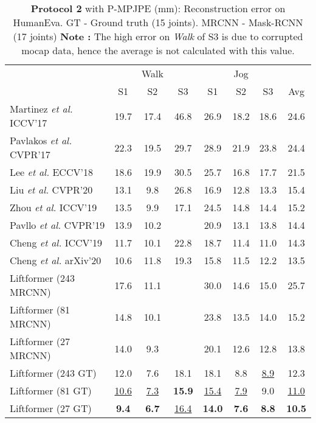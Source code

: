\documentclass[letterpaper]{article}
\begin{document}
\begin{table}[tp]
\begin{adjustbox}{width=1\columnwidth}
\begin{tabular}{l|ccc|ccc|c}
\hline
&  & Walk &  &  & Jog &  & \\
& S1 & S2 & S3 & S1 & S2 & S3 & Avg\\
\hline
Martinez \textit{et al.} ICCV’17 \cite{martinez17} & 19.7 & 17.4 & 46.8 & 26.9 & 18.2 & 18.6 & 24.6\\
Pavlakos \textit{et al.} CVPR’17 \cite{pavlakos18} & 22.3 & 19.5 & 29.7 & 28.9 & 21.9 & 23.8 & 24.4\\
Lee \textit{et al.} ECCV’18 \cite{lee18} & 18.6 & 19.9 & 30.5 & 25.7 & 16.8 & 17.7 & 21.5\\
Liu \textit{et al.} CVPR’20 \cite{liu20} & 13.1 & 9.8 & 26.8 & 16.9 & 12.8 & 13.3 & 15.4\\
Zhou \textit{et al.} ICCV'19 \cite{zhou19} & 13.5 & 9.9 & 17.1 & 24.5 & 14.8 & 14.4 & 15.2 \\
Pavllo \textit{et al.} CVPR’19 \cite{pavllo19} & 13.9 & 10.2 &  & 20.9 & 13.1 & 13.8 & 14.4 \\
Cheng \textit{et al.} ICCV'19 \cite{cheng19} & 11.7 & 10.1 & 22.8 & 18.7 & 11.4 & 11.0 & 14.3\\
Cheng \textit{et al.} arXiv'20 \cite{cheng20} & 10.6 & 11.8 & 19.3 & 15.8 & 11.5 & 12.2 & 13.5\\
\hline
Liftformer (243 MRCNN) & 17.6 & 11.1 &  & 30.0 & 14.6 & 15.0 & 25.7 \\
Liftformer (81 MRCNN) & 14.8 & 10.1 &  & 23.8 & 13.5 & 14.0 & 15.2 \\
Liftformer (27 MRCNN) & 14.0 & 9.3 &  & 20.1 & 12.6 & 12.8 & 13.8 \\
\hline
Liftformer (243 GT)  & 12.0 & 7.6 & 18.1 & 18.1 & 8.8 & \underline{8.9} & 12.3\\
Liftformer (81 GT)  & \underline{10.6} & \underline{7.3} & \textbf{15.9} & \underline{15.4} & \underline{7.9} & 9.0 & \underline{11.0}\\
Liftformer (27 GT) & \textbf{9.4} & \textbf{6.7} & \underline{16.4} & \textbf{14.0} & \textbf{7.6} & \textbf{8.8} & \textbf{10.5}\\
\end{tabular}
\end{adjustbox}
\caption{\textbf{Protocol 2} with P-MPJPE (mm): Reconstruction error on HumanEva. GT - Ground truth (15 joints). MRCNN - Mask-RCNN (17 joints)  \textbf{Note :} The high error on \textit{Walk} of S3 is due to corrupted mocap data, hence the average is not calculated with this value.}
\label{heval:p-mpjpe}
\end{table}
\end{document}
